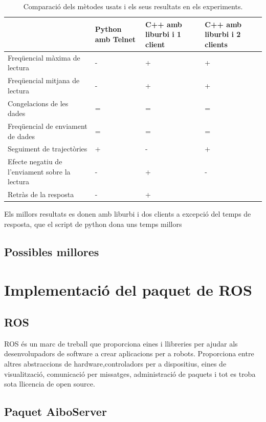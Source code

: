 \documentclass[12pt,a4paper,final,twoside]{article}
\begin{document}
\begin{table}[H]
\begin{center}
\begin{tabulary}{\textwidth}{|p{4cm}|p{3cm}|p{3cm}|p{3cm}|}
\hline

&\textbf{Python amb Telnet} & \textbf{C++ amb liburbi i 1 client} & \textbf{C++ amb liburbi i 2 clients} \\ \hline
Freqüencial màxima de lectura & - & + & + \\ \hline
Freqüencial mitjana de lectura & - & + & +  \\ \hline
Congelacions de les dades & = & = &= \\ \hline
Freqüencial de enviament de dades & = & = & = \\ \hline
Seguiment de trajectòries & + & - & + \\ \hline
Efecte negatiu de l'enviament sobre la lectura& - & + & - \\ \hline
Retràs de la resposta & - & + & \\ \hline
\end{tabulary}
\end{center}
\caption{Comparació dels mètodes usats i els seus resultats en els experiments.\label{comp}}
\end{table}
Els millors resultats es donen amb liburbi i dos clients a excepció del temps de resposta, que el script de python dona uns temps millors
\subsection{Possibles millores}
\section{Implementació del paquet de ROS}
\subsection{ROS}
\label{ros}
ROS és un marc de treball que proporciona eines i llibreries per ajudar als desenvolupadors de software a crear aplicacions per a robots. Proporciona entre altres abstraccions de hardware,controladors per a dispositius, eines de visualització, comunicació per missatges, administració de paquets i tot es troba sota llicencia de open source.



\subsection{Paquet AiboServer }
\end{document}
